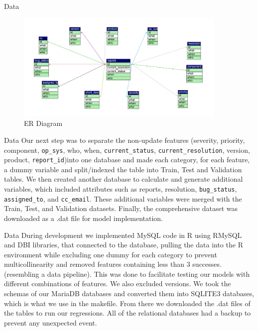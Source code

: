 \documentclass[10pt]{beamer}
\begin{document}
\begin{frame}[t]{Data}\justifying \vspace{10pt}
\begin{figure}[htp]
	\centering
	\includegraphics[width=0.9\textwidth]{./ER_diagram.jpg}
	\caption{ER Diagram}
	\label{fig:picture1}
\end{figure}
\end{frame}


\begin{frame}[t]{Data}\justifying \vspace{20pt}
	Our next step was to separate the non-update features (severity, priority, component, \texttt{op\_sys}, who, when, \texttt{current\_status}, \texttt{current\_resolution}, version, product, \texttt{report\_id})into one database and made each category, for each feature, a dummy variable and split/indexed the table into Train, Test and Validation tables. 
	\vskip 10pt 
	We then created another database to calculate and generate additional variables, which included attributes such as reports, resolution, \texttt{bug\_status}, \texttt{assigned\_to}, and \texttt{cc\_email}. These additional variables were merged with the Train, Test, and Validation datasets. Finally, the comprehensive dataset was downloaded as a .dat file for model implementation.
\end{frame}


\begin{frame}[t]{Data}\justifying \vspace{20pt}
	During development we implemented MySQL code in R using RMySQL and DBI libraries, that connected to the database, pulling the data into the R environment while excluding one dummy for each category to prevent multicollinearity and removed features containing less than 3 successes. (resembling a data pipeline). This was done to facilitate testing our models with different combinations of features. We also excluded versions. We took the schemas of our MariaDB databases and converted them into SQLITE3 databases, which is what we use in the makefile. From there we downloaded the .dat files of the tables to run our regressions. All of the relational databases had a backup to prevent any unexpected event.
\end{frame}
\end{document}
